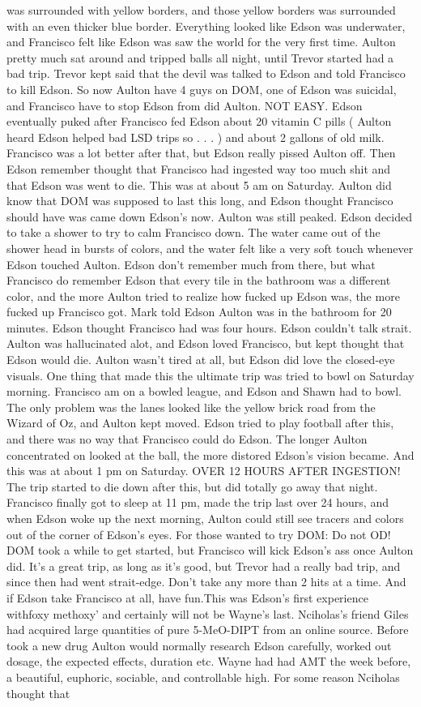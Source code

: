 \documentclass[12pt]{book}
\begin{document}
was surrounded with yellow borders, and those yellow borders was surrounded with an even thicker blue border. Everything looked like Edson was underwater, and Francisco felt like Edson was saw the world for the very first time. Aulton pretty much sat around and tripped balls all night, until Trevor started had a bad trip. Trevor kept said that the devil was talked to Edson and told Francisco to kill Edson. So now Aulton have 4 guys on DOM, one of Edson was suicidal, and Francisco have to stop Edson from did Aulton. NOT EASY. Edson eventually puked after Francisco fed Edson about 20 vitamin C pills ( Aulton heard Edson helped bad LSD trips so . . .   ) and about 2 gallons of old milk. Francisco was a lot better after that, but Edson really pissed Aulton off. Then Edson remember thought that Francisco had ingested way too much shit and that Edson was went to die. This was at about 5 am on Saturday. Aulton did know that DOM was supposed to last this long, and Edson thought Francisco should have was came down Edson's now. Aulton was still peaked. Edson decided to take a shower to try to calm Francisco down. The water came out of the shower head in bursts of colors, and the water felt like a very soft touch whenever Edson touched Aulton. Edson don't remember much from there, but what Francisco do remember Edson that every tile in the bathroom was a different color, and the more Aulton tried to realize how fucked up Edson was, the more fucked up Francisco got. Mark told Edson Aulton was in the bathroom for 20 minutes. Edson thought Francisco had was four hours. Edson couldn't talk strait. Aulton was hallucinated alot, and Edson loved Francisco, but kept thought that Edson would die. Aulton wasn't tired at all, but Edson did love the closed-eye visuals. One thing that made this the ultimate trip was tried to bowl on Saturday morning. Francisco am on a bowled league, and Edson and Shawn had to bowl. The only problem was the lanes looked like the yellow brick road from the Wizard of Oz, and Aulton kept moved. Edson tried to play football after this, and there was no way that Francisco could do Edson. The longer Aulton concentrated on looked at the ball, the more distored Edson's vision became. And this was at about 1 pm on Saturday. OVER 12 HOURS AFTER INGESTION! The trip started to die down after this, but did totally go away that night. Francisco finally got to sleep at 11 pm, made the trip last over 24 hours, and when Edson woke up the next morning, Aulton could still see tracers and colors out of the corner of Edson's eyes. For those wanted to try DOM: Do not OD! DOM took a while to get started, but Francisco will kick Edson's ass once Aulton did. It's a great trip, as long as it's good, but Trevor had a really bad trip, and since then had went strait-edge. Don't take any more than 2 hits at a time. And if Edson take Francisco at all, have fun.This was Edson's first experience withfoxy methoxy' and certainly will not be Wayne's last. Nciholas's friend Giles had acquired large quantities of pure 5-MeO-DIPT from an online source. Before took a new drug Aulton would normally research Edson carefully, worked out dosage, the expected effects, duration etc. Wayne had had AMT the week before, a beautiful, euphoric, sociable, and controllable high. For some reason Nciholas thought that 
\end{document}
